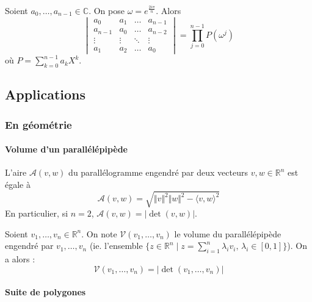   \begin{example}
    Soient $a_0, \dots, a_{n-1} \in \mathbb{C}$. On pose $\omega = e^{\frac{2i\pi}{n}}$. Alors
    \[ \begin{vmatrix} a_0 & a_1 & \dots & a_{n-1} \\ a_{n-1} & a_0 & \dots & a_{n-2}\\ \vdots & \vdots & \ddots & \vdots \\ a_1 & a_2 & \dots & a_0 \end{vmatrix} = \prod_{j=0}^{n-1} P(\omega^j) \]
    où $P = \sum_{k=0}^{n-1} a_k X^k$.
  \end{example}

  \subsection{Applications}

  \subsubsection{En géométrie}

  \paragraph{Volume d'un parallélépipède}


  \begin{theorem}
    L'aire $\mathcal{A}(v,w)$ du parallélogramme engendré par deux vecteurs $v, w \in \mathbb{R}^n$ est égale à
    \[ \mathcal{A}(v,w) = \sqrt{\Vert v \Vert^2\Vert w \Vert^2 - \langle v,w \rangle^2} \]
    En particulier, si $n=2$, $\mathcal{A}(v,w)=\vert\det(v,w)\vert$.
  \end{theorem}

  \begin{corollary}
    Soient $v_1, \dots, v_n \in \mathbb{R}^n$. On note $\mathcal{V}(v_1, \dots, v_n)$ le volume du parallélépipède engendré par $v_1, \dots, v_n$ (ie. l'ensemble $\{ z \in \mathbb{R}^n \mid z = \sum_{i=1}^n \lambda_i v_i, \, \lambda_i \in [0,1] \}$). On a alors :
    \[ \mathcal{V}(v_1, \dots, v_n) = \vert \det(v_1, \dots, v_n) \vert \]
  \end{corollary}

  \paragraph{Suite de polygones}

